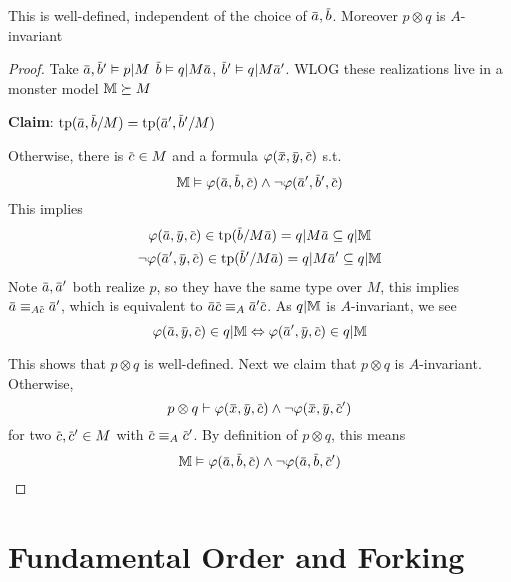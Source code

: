 \documentclass[11pt]{article}
\begin{document}
\begin{lemma}[]
This is well-defined, independent of the choice of \(\bara,\barb\). Moreover \(p\otimes q\) is \(A\)-invariant
\end{lemma}

\begin{proof}
Take \(\bara,\barb'\vDash p|M\) \(\barb\vDash q|M\bara\), \(\barb'\vDash q|M\bara'\). WLOG these realizations
live in a monster model \(\mathbb{M}\succeq M\)

\textbf{Claim}: \(\tp(\bara,\barb/M)=\tp(\bara',\barb'/M)\)

Otherwise, there is \(\barc\in M\) and a formula \(\varphi(\barx,\bary,\barc)\) s.t.
\begin{equation*}
\M\vDash\varphi(\bara,\barb,\barc)\wedge\neg\varphi(\bara',\barb',\barc)
\end{equation*}
This implies
\begin{gather*}
\varphi(\bara,\bary,\barc)\in\tp(\barb/M\bara)=q|M\bara\subseteq q|\M\\
\neg\varphi(\bara',\bary,\barc)\in\tp(\barb'/M\bara)=q|M\bara'\subseteq q|\M
\end{gather*}
Note \(\bara,\bara'\) both realize \(p\), so they have the same type over \(M\), this
implies \(\bara\equiv_{A\barc}\bara'\), which is equivalent to \(\bara\barc\equiv_A\bara'\barc\).
As \(q|\mathbb{M}\) is \(A\)-invariant, we see
\begin{equation*}
\varphi(\bara,\bary,\barc)\in q|\M\Leftrightarrow\varphi(\bara',\bary,\barc)\in q|\M
\end{equation*}

This shows that \(p\otimes q\) is well-defined. Next we claim that \(p\otimes q\) is \(A\)-invariant.
Otherwise,
\begin{equation*}
p\otimes q\vdash\varphi(\barx,\bary,\barc)\wedge\neg\varphi(\barx,\bary,\barc')
\end{equation*}
for two \(\barc,\barc'\in M\) with \(\barc\equiv_A\barc'\). By definition of \(p\otimes q\), this means
\begin{equation*}
\M\vDash\varphi(\bara,\barb,\barc)\wedge\neg\varphi(\bara,\barb,\barc')
\end{equation*}
\end{proof}


\section{Fundamental Order and Forking}
\label{sec:org9907e42}
\end{document}
